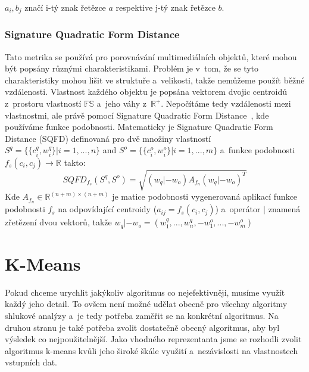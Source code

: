$a_i, b_j$ značí i-tý znak řetězce $a$ respektive j-tý znak řetězce $b$.

\subsubsection{Signature Quadratic Form Distance}
Tato metrika se používá pro porovnávání multimediálních objektů, které mohou být popsány různými charakteristikami. Problém je v~tom, že se tyto charakteristiky mohou lišit ve struktuře a~velikosti, takže nemůžeme použít běžné vzdálenosti. Vlastnost každého objektu je popsána vektorem dvojic centroidů z~prostoru vlastností $\mathbb{FS}$ a~jeho váhy z~$\mathbb{R^{+}}$.
Nepočítáme tedy vzdálenosti mezi vlastnostmi, ale právě pomocí Signature Quadratic Form Distance~\cite{Beecks10}, kde používáme funkce podobnosti.
Matematicky je Signature Quadratic Form Distance (SQFD) definovaná pro dvě množiny vlastností $S^{q} = \{\{c_i^q, w_i^q\}|i=1,...,n\}$ and $S^{o} = \{\{c_i^o, w_i^o\}|i=1,...,m\}$ a~funkce podobnosti $f_s(c_i, c_j)\to \mathbb{R}$ takto:
$$SQFD_{f_s}(S^q,S^o)=\sqrt{(w_q|-w_o)A_{f_n}(w_q|-w_o)^T}$$
Kde $A_{f_n} \in \mathbb{R}^{(n+m)\times(n+m)}$ je matice podobnosti vygenerovaná aplikací funkce podobnosti $f_s$ na odpovídající centroidy  ($a_{ij}=f_s(c_i,c_j)$) a~operátor $|$ znamená zřetězení dvou vektorů, takže $w_q|-w_o = (w_1^q,...,w_n^q,-w_1^o,...,-w_m^o)$\\

\section{K-Means}
Pokud chceme urychlit jakýkoliv algoritmus co nejefektivněji, musíme využít každý jeho detail. To ovšem není možné udělat obecně pro všechny algoritmy shlukové analýzy a~je tedy potřeba zaměřit se na konkrétní algoritmus. Na druhou stranu je také potřeba zvolit dostatečně obecný algoritmus, aby byl výsledek co nejpoužitelnější. Jako vhodného reprezentanta jsme se rozhodli zvolit algoritmus k-means kvůli jeho široké škále využití a~nezávislosti na vlastnostech vstupních dat. \\

